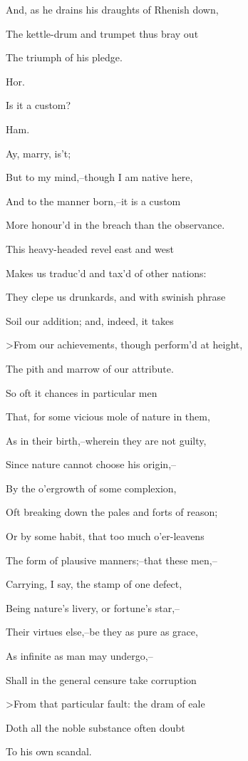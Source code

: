 \documentclass[12pt]{book}
\begin{document}
And, as he drains his draughts of Rhenish down,

The kettle-drum and trumpet thus bray out

The triumph of his pledge.



Hor.

Is it a custom?



Ham.

Ay, marry, is't;

But to my mind,--though I am native here,

And to the manner born,--it is a custom

More honour'd in the breach than the observance.

This heavy-headed revel east and west

Makes us traduc'd and tax'd of other nations:

They clepe us drunkards, and with swinish phrase

Soil our addition; and, indeed, it takes

>From our achievements, though perform'd at height,

The pith and marrow of our attribute.

So oft it chances in particular men

That, for some vicious mole of nature in them,

As in their birth,--wherein they are not guilty,

Since nature cannot choose his origin,--

By the o'ergrowth of some complexion,

Oft breaking down the pales and forts of reason;

Or by some habit, that too much o'er-leavens

The form of plausive manners;--that these men,--

Carrying, I say, the stamp of one defect,

Being nature's livery, or fortune's star,--

Their virtues else,--be they as pure as grace,

As infinite as man may undergo,--

Shall in the general censure take corruption

>From that particular fault: the dram of eale

Doth all the noble substance often doubt

To his own scandal.
\end{document}
